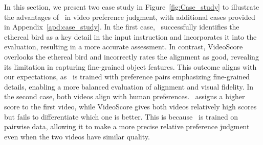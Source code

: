 In this section, we present two case study in Figure~\ref{fig:Case_study} to illustrate the advantages of \algname\ in video preference judgment, with additional cases provided in Appendix~\ref{apd:case_study}. In the first case, \algname\ successfully identifies the ethereal bird as a key detail in the input instruction and incorporates it into the evaluation, resulting in a more accurate assessment. In contrast, VideoScore overlooks the ethereal bird and incorrectly rates the alignment as good, revealing its limitation in capturing fine-grained object features. This outcome aligns with our expectations, as \algname\ is trained with preference pairs emphasizing fine-grained details, enabling a more balanced evaluation of alignment and visual fidelity. In the second case, both videos align with human preferences. \algname\ assigns a higher score to the first video, while VideoScore gives both videos relatively high scores but fails to differentiate which one is better. This is because \algname\ is trained on pairwise data, allowing it to make a more precise relative preference judgment even when the two videos have similar quality.

















